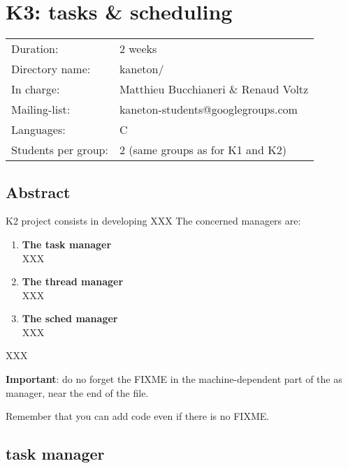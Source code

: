 
%
%

\chapter{K3: tasks & scheduling}

%
%

\begin{tabular}{p{7cm}l}
Duration: & 2 weeks \\
Directory name: & kaneton/ \\
In charge: & Matthieu Bucchianeri \& Renaud Voltz\\
Mailing-list: & kaneton-students@googlegroups.com \\
Languages: & C \\
Students per group: & 2 (same groups as for K1 and K2) \\
\end{tabular}

\section{Abstract}

K2 project consists in developing XXX
The concerned managers are:

\begin{enumerate}
  \item
    {\bf The task manager}\\
    XXX
  \item
    {\bf The thread manager}\\
    XXX
  \item
    {\bf The sched manager}\\
    XXX
\end{enumerate}

XXX

\textbf{Important}: do no forget the FIXME in the machine-dependent
part of the as manager, near the end of the file.

Remember that you can add code even if there is no FIXME.


%
%

\newpage

\section{\textbf{task} manager}

